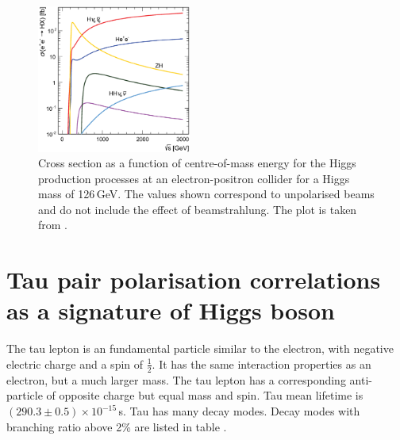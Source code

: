\begin{figure}[!htbp]
\centering
\includegraphics[width=0.45\textwidth]{theory/HiggsCLICcrossSection}
\caption[]
{Cross section as a function of centre-of-mass energy for the Higgs production processes at an electron-positron collider for a Higgs mass of 126\,GeV. The values shown correspond to unpolarised beams and do not include the effect of beamstrahlung. The plot is taken from \cite{Abramowicz:2016zbo}.}
\label{fig:theoryHiggsCrossSection}
\end{figure}


\section{Tau pair polarisation correlations as a signature of Higgs boson}
\label{sec:theoryTauPair}


The tau lepton is an fundamental particle similar to the electron, with negative electric charge and a spin of $\frac{1}{2}$. It has the same interaction properties as an electron, but a much larger mass. The tau lepton has a corresponding anti-particle of opposite charge but equal mass and spin. Tau mean lifetime is $(290.3\pm0.5)\times10^{-15}$\,s. Tau has many decay modes. Decay modes with branching ratio above 2\% are listed in table .


